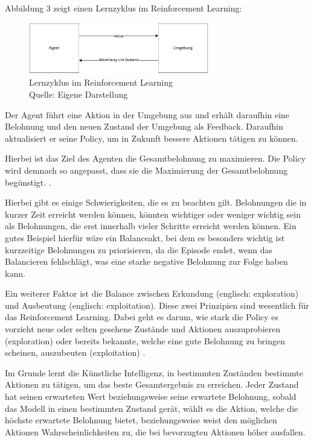 	Abbildung 3 zeigt einen Lernzyklus im Reinforcement Learning:
\nopagebreak
\begin{figure}[H]
\centering
\includegraphics[width=0.7\textwidth]{Bilder/reinforcement.drawio} 
\caption[Lernzyklus im Reinforcement Learning]{Lernzyklus im Reinforcement Learning\\ Quelle: Eigene Darstellung}
\end{figure}

Der Agent führt eine Aktion in der Umgebung aus und erhält daraufhin eine Belohnung und den neuen Zustand der Umgebung als Feedback. Daraufhin aktualisiert er seine Policy, um in Zukunft bessere Aktionen tätigen zu können.

Hierbei ist das Ziel des Agenten die Gesamtbelohnung zu maximieren. Die Policy wird demnach so angepasst, dass sie die Maximierung der Gesamtbelohnung begünstigt. \cite[S. 12f]{ris-ala_fundamentals_2023}.

Hierbei gibt es einige Schwierigkeiten, die es zu beachten gilt. Belohnungen die in kurzer Zeit erreicht werden können, könnten wichtiger oder weniger wichtig sein als Belohnungen, die erst innerhalb vieler Schritte erreicht werden können. Ein gutes Beispiel hierfür wäre ein Balanceakt, bei dem es besonders wichtig ist kurzzeitige Belohnungen zu priorisieren, da die Episode endet, wenn das Balancieren fehlschlägt, was eine starke negative Belohnung zur Folge haben kann.

Ein weiterer Faktor ist die Balance zwischen Erkundung (englisch: exploration) und Ausbeutung (englisch: exploitation). Diese zwei Prinzipien sind wesentlich für das Reinforcement Learning. Dabei geht es darum, wie stark die Policy es vorzieht neue oder selten gesehene Zustände und Aktionen auszuprobieren (exploration) oder bereits bekannte, welche eine gute Belohnung zu bringen scheinen, auszubeuten (exploitation) \cite[S. 13]{ris-ala_fundamentals_2023}.

Im Grunde lernt die Künstliche Intelligenz, in bestimmten Zuständen bestimmte Aktionen zu tätigen, um das beste Gesamtergebnis zu erreichen. Jeder Zustand hat seinen erwarteten Wert beziehungsweise seine erwartete Belohnung, sobald das Modell in einen bestimmten Zustand gerät, wählt es die Aktion, welche die höchste erwartete Belohnung bietet, beziehungsweise weist den möglichen Aktionen Wahrscheinlichkeiten zu, die bei bevorzugten Aktionen höher ausfallen.\\

